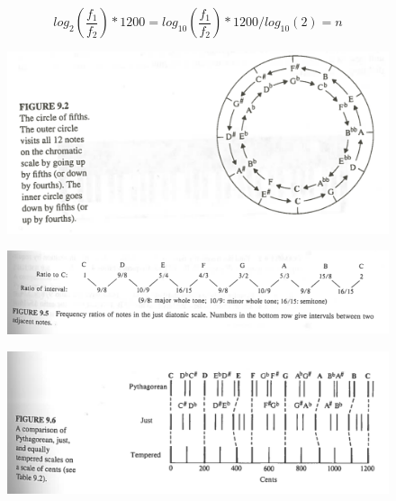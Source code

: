 \documentclass{article}
\begin{document}
\begin{equation}
   log_2( \frac{f_1}{f_2})*1200 = log_{10}( \frac{f_1}{f_2})*1200/log_{10}(2)=n
\end{equation}
\begin{figure}[H]
    \centering
    \includegraphics{figures/oving9_1.png}
    \label{fig:1}
\end{figure}

\begin{figure}[H]
    \centering
    \includegraphics[scale=1.5]{figures/oving9_4.png}
\end{figure}

\begin{figure}[H]
    \centering
    \includegraphics{figures/oving9_2.png}
    \label{fig:2}
\end{figure}
\end{document}
